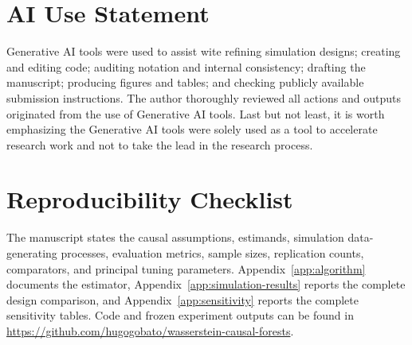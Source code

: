 \documentclass[twoside]{article}
\begin{document}
\section*{AI Use Statement}

Generative AI tools were used to assist wite refining simulation designs; creating and editing code; auditing notation and internal consistency; drafting the manuscript; producing figures and tables; and checking publicly available submission instructions. The author thoroughly reviewed all actions and outputs originated from the use of Generative AI tools. Last but not least, it is worth emphasizing the Generative AI tools were solely used as a tool to accelerate research work and not to take the lead in the research process.



\clearpage
\section*{Reproducibility Checklist}

The manuscript states the causal assumptions, estimands, simulation data-generating processes, evaluation metrics, sample sizes, replication counts, comparators, and principal tuning parameters. Appendix~\ref{app:algorithm} documents the estimator, Appendix~\ref{app:simulation-results} reports the complete design comparison, and Appendix~\ref{app:sensitivity} reports the complete sensitivity tables. Code and frozen experiment outputs can be found in \url{https://github.com/hugogobato/wasserstein-causal-forests}.

\clearpage
\appendix
\onecolumn

\end{document}
